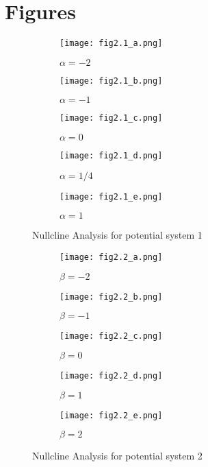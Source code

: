\section{Figures}\label{sec:figures}

\begin{figure}[H]
    \centering
    \begin{subfigure}{.32\textwidth}
        \centering
        \texttt{[image: fig2.1\_a.png]}
        \caption{$\alpha=-2$}
    \end{subfigure}
    \begin{subfigure}{.32\textwidth}
        \centering
        \texttt{[image: fig2.1\_b.png]}
        \caption{$\alpha=-1$}
    \end{subfigure}
    \begin{subfigure}{.32\textwidth}
        \centering
        \texttt{[image: fig2.1\_c.png]}
        \caption{$\alpha=0$}
    \end{subfigure}
    \begin{subfigure}{.49\textwidth}
        \centering
        \texttt{[image: fig2.1\_d.png]}
        \caption{$\alpha=1/4$}
    \end{subfigure}
    \begin{subfigure}{.49\textwidth}
        \centering
        \texttt{[image: fig2.1\_e.png]}
        \caption{$\alpha=1$}
    \end{subfigure}
    \caption{Nullcline Analysis for potential system 1}
    \label{fig:1}
\end{figure}

\begin{figure}[H]
    \centering
    \begin{subfigure}{.32\textwidth}
        \centering
        \texttt{[image: fig2.2\_a.png]}
        \caption{$\beta=-2$}
    \end{subfigure}
    \begin{subfigure}{.32\textwidth}
        \centering
        \texttt{[image: fig2.2\_b.png]}
        \caption{$\beta=-1$}
    \end{subfigure}
    \begin{subfigure}{.32\textwidth}
        \centering
        \texttt{[image: fig2.2\_c.png]}
        \caption{$\beta=0$}
    \end{subfigure}
    \begin{subfigure}{.49\textwidth}
        \centering
        \texttt{[image: fig2.2\_d.png]}
        \caption{$\beta=1$}
    \end{subfigure}
    \begin{subfigure}{.49\textwidth}
        \centering
        \texttt{[image: fig2.2\_e.png]}
        \caption{$\beta=2$}
    \end{subfigure}
    \caption{Nullcline Analysis for potential system 2}
    \label{fig:2}
\end{figure}


